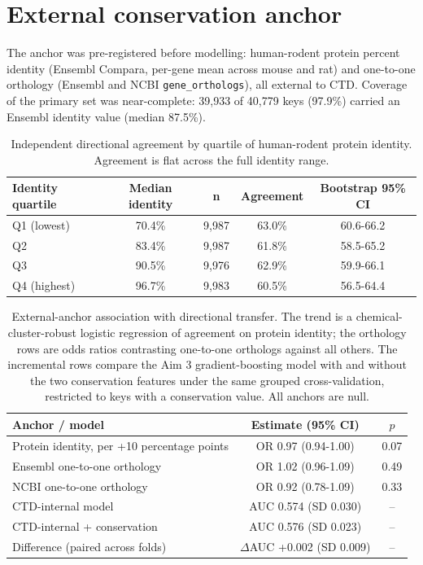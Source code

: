 \documentclass[11pt]{elsarticle}
\begin{document}
\clearpage
\section{External conservation anchor}

\noindent The anchor was pre-registered before modelling: human-rodent protein
percent identity (Ensembl Compara, per-gene mean across mouse and rat) and
one-to-one orthology (Ensembl and NCBI \texttt{gene\_orthologs}), all external to
CTD. Coverage of the primary set was near-complete: 39{,}933 of 40{,}779 keys
(97.9\%) carried an Ensembl identity value (median 87.5\%).

\begin{table}[H]
\small
\centering
\caption{Independent directional agreement by quartile of human-rodent protein
identity. Agreement is flat across the full identity range.}
\label{tab:s7}
\begin{tabular}{lcccc}
\toprule
Identity quartile & Median identity & n & Agreement & Bootstrap 95\% CI \\
\midrule
Q1 (lowest) & 70.4\% & 9{,}987 & 63.0\% & 60.6-66.2 \\
Q2 & 83.4\% & 9{,}987 & 61.8\% & 58.5-65.2 \\
Q3 & 90.5\% & 9{,}976 & 62.9\% & 59.9-66.1 \\
Q4 (highest) & 96.7\% & 9{,}983 & 60.5\% & 56.5-64.4 \\
\bottomrule
\end{tabular}
\end{table}

\begin{table}[H]
\small
\centering
\caption{External-anchor association with directional transfer. The trend is a
chemical-cluster-robust logistic regression of agreement on protein identity;
the orthology rows are odds ratios contrasting one-to-one orthologs against all
others. The incremental rows compare the Aim 3 gradient-boosting model with and
without the two conservation features under the same grouped cross-validation,
restricted to keys with a conservation value. All anchors are null.}
\label{tab:s8}
\begin{tabular}{lcc}
\toprule
Anchor / model & Estimate (95\% CI) & $p$ \\
\midrule
Protein identity, per +10 percentage points & OR 0.97 (0.94-1.00) & 0.07 \\
Ensembl one-to-one orthology & OR 1.02 (0.96-1.09) & 0.49 \\
NCBI one-to-one orthology & OR 0.92 (0.78-1.09) & 0.33 \\
\midrule
CTD-internal model & AUC 0.574 (SD 0.030) & -- \\
CTD-internal + conservation & AUC 0.576 (SD 0.023) & -- \\
Difference (paired across folds) & $\Delta$AUC +0.002 (SD 0.009) & -- \\
\bottomrule
\end{tabular}
\end{table}
\end{document}
